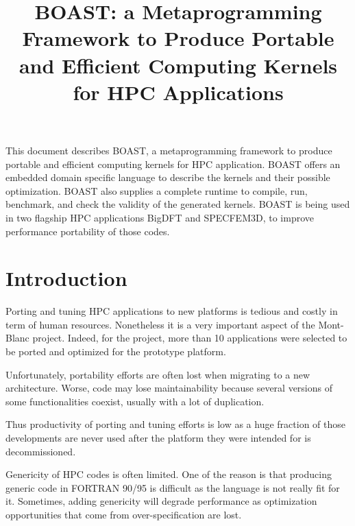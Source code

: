 \documentclass[11pt, a4paper, twoside]{montblanc}
\begin{document}
\title{BOAST: a Metaprogramming Framework to Produce Portable and Efficient Computing Kernels for HPC Applications}

\maketitle

\begin{changelog}
\end{changelog}

\frontmatter

\begin{executive}
This document describes BOAST, a metaprogramming framework to produce portable
and efficient computing kernels for HPC application. BOAST offers an embedded
domain specific language to describe the kernels and their possible
optimization. BOAST also supplies a complete runtime to compile, run, benchmark,
and check the validity of the generated kernels. BOAST is being used in two
flagship HPC applications BigDFT and SPECFEM3D, to improve performance
portability of those codes.
\end{executive}

\section{Introduction}

Porting and tuning HPC applications to new platforms is tedious and costly in
term of human resources. Nonetheless it is a very important aspect of the
Mont-Blanc project. Indeed, for the project, more than 10 applications were
selected to be ported and optimized for the prototype platform.

Unfortunately, portability efforts are often lost when migrating to a new
architecture. Worse, code may lose maintainability because several versions of
some functionalities coexist, usually with a lot of duplication.

Thus productivity of porting and tuning efforts is low as a huge fraction of
those developments are never used after the platform they were intended for is
decommissioned.

Genericity of HPC codes is often limited. One of the reason is that producing
generic code in FORTRAN 90/95 is difficult as the language is not really fit
for it. Sometimes, adding genericity will degrade performance as optimization
opportunities that come from over-specification are lost.
\end{document}
